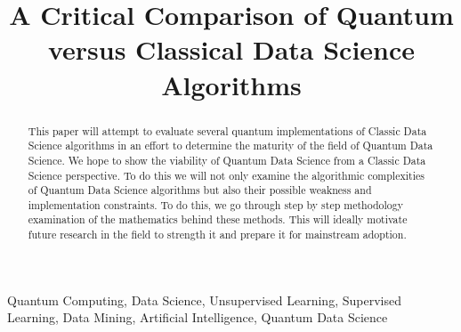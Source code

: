 \documentclass[conference]{IEEEtran}
\begin{document}
\title{A Critical Comparison of Quantum versus Classical Data Science
Algorithms\\


}

\author{


}

\maketitle

\begin{abstract}
This paper will attempt to evaluate several quantum implementations of Classic Data Science algorithms in an effort to determine the maturity of the field of Quantum Data Science. We hope to show the viability of Quantum Data Science from a Classic Data Science perspective.  To do this we will not only examine the algorithmic complexities of Quantum Data Science algorithms but also their possible weakness and implementation constraints. To do this, we go through step by step methodology examination of the mathematics behind these methods. This will ideally motivate future research in the field to strength it and prepare it for mainstream adoption. 
\end{abstract}

\begin{IEEEkeywords}
Quantum Computing, Data Science, Unsupervised Learning, Supervised Learning, Data Mining, Artificial Intelligence, Quantum Data Science 
\end{IEEEkeywords}
\end{document}

